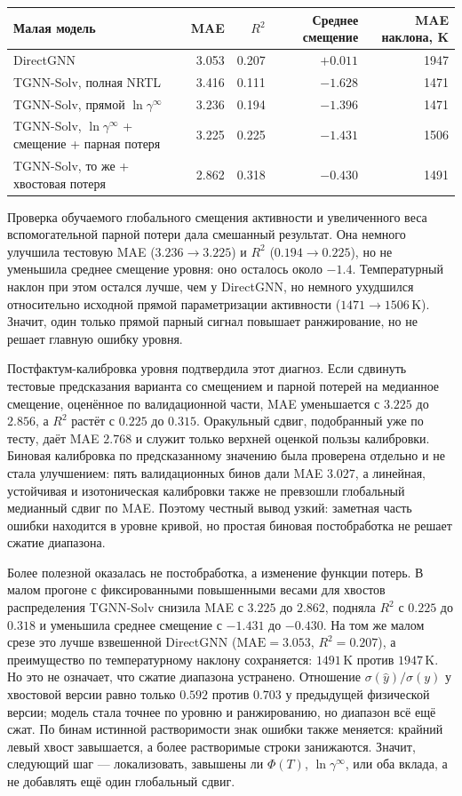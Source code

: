 \documentclass[11pt]{article}
\newcommand{\mae}{\mathrm{MAE}}
\newcommand{\Rtwo}{R^2}
\theoremstyle{definition}
\begin{document}
\begin{center}
\small
\begin{tabularx}{\textwidth}{P{0.31\textwidth}rrrr}
\toprule
Малая модель & MAE & $R^2$ & Среднее смещение & MAE наклона, K \\
\midrule
DirectGNN & 3.053 & 0.207 & $+0.011$ & 1947 \\
TGNN-Solv, полная NRTL & 3.416 & 0.111 & $-1.628$ & 1471 \\
TGNN-Solv, прямой $\ln\gamma^\infty$ & 3.236 & 0.194 & $-1.396$ & 1471 \\
TGNN-Solv, $\ln\gamma^\infty$ + смещение + парная потеря & 3.225 & 0.225 & $-1.431$ & 1506 \\
TGNN-Solv, то же + хвостовая потеря & 2.862 & 0.318 & $-0.430$ & 1491 \\
\bottomrule
\end{tabularx}
\end{center}

Проверка обучаемого глобального смещения активности и увеличенного веса вспомогательной парной потери дала смешанный результат. Она немного улучшила тестовую MAE ($3.236\to3.225$) и $R^2$ ($0.194\to0.225$), но не уменьшила среднее смещение уровня: оно осталось около $-1.4$. Температурный наклон при этом остался лучше, чем у DirectGNN, но немного ухудшился относительно исходной прямой параметризации активности ($1471\to1506\,\mathrm K$). Значит, один только прямой парный сигнал повышает ранжирование, но не решает главную ошибку уровня.

Постфактум-калибровка уровня подтвердила этот диагноз. Если сдвинуть тестовые предсказания варианта со смещением и парной потерей на медианное смещение, оценённое по валидационной части, MAE уменьшается с $3.225$ до $2.856$, а $R^2$ растёт с $0.225$ до $0.315$. Оракульный сдвиг, подобранный уже по тесту, даёт MAE $2.768$ и служит только верхней оценкой пользы калибровки. Биновая калибровка по предсказанному значению была проверена отдельно и не стала улучшением: пять валидационных бинов дали MAE $3.027$, а линейная, устойчивая и изотоническая калибровки также не превзошли глобальный медианный сдвиг по MAE. Поэтому честный вывод узкий: заметная часть ошибки находится в уровне кривой, но простая биновая постобработка не решает сжатие диапазона.

Более полезной оказалась не постобработка, а изменение функции потерь. В малом прогоне с фиксированными повышенными весами для хвостов распределения TGNN-Solv снизила MAE с $3.225$ до $2.862$, подняла $R^2$ с $0.225$ до $0.318$ и уменьшила среднее смещение с $-1.431$ до $-0.430$. На том же малом срезе это лучше взвешенной DirectGNN ($\mae=3.053$, $\Rtwo=0.207$), а преимущество по температурному наклону сохраняется: $1491\,\mathrm K$ против $1947\,\mathrm K$. Но это не означает, что сжатие диапазона устранено. Отношение $\sigma(\hat y)/\sigma(y)$ у хвостовой версии равно только $0.592$ против $0.703$ у предыдущей физической версии; модель стала точнее по уровню и ранжированию, но диапазон всё ещё сжат. По бинам истинной растворимости знак ошибки также меняется: крайний левый хвост завышается, а более растворимые строки занижаются. Значит, следующий шаг --- локализовать, завышены ли $\Phi(T)$, $\ln\gamma^\infty$, или оба вклада, а не добавлять ещё один глобальный сдвиг.
\end{document}
